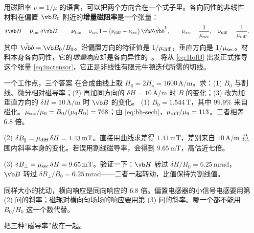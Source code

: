 用磁阻率 $\nu=1/\mu$ 的语言，可以把两个方向合在一个式子里。各向同性的非线性材料在偏置 $\vb B_0$ 附近的\textbf{增量磁阻率}是一个张量：
\begin{equation}
\delta\vb H=\boldsymbol\nu_{\rm inc}\,\delta\vb B,\qquad
\boldsymbol\nu_{\rm inc}=\nu_{\rm sec}\,\mathbf I+\bigl(\nu_{\rm diff}-\nu_{\rm sec}\bigr)\,\hat{\vb b}\hat{\vb b}^{\mathsf T},\qquad
\nu_{\rm sec}=\frac{1}{\mu_{\rm sec}},\quad \nu_{\rm diff}=\frac{1}{\mu_{\rm diff}},
\label{eq:bh-inc}
\end{equation}
其中 $\hat{\vb b}=\vb B_0/B_0$。沿偏置方向的特征值是 $1/\mu_{\rm diff}$，垂直方向是 $1/\mu_{\rm sec}$。材料本身各向同性，它的\emph{增量}响应却是各向异性的~\cite{comsolbh}。 将从 \eqref{eq:HofB} 出发正式推导这个张量 \eqref{eq:inctensor}，它正是非线性有限元牛顿迭代所需的切线。

\begin{example}[label=ex:bh-three]{一个工作点，三个答案}
在合成曲线上取 $H_0=2H_s=1600\,\mathrm{A/m}$。求：(1) $B_0$ 与割线、微分相对磁导率；(2) 再加同方向的 $\delta H=10\,\mathrm{A/m}$ 时 $B$ 的变化；(3) 改为加垂直方向的 $\delta H=10\,\mathrm{A/m}$ 时 $\vb B$ 的变化。
\solution
(1) $B_0=1.544\,\mathrm T$，其中 $99.9\%$ 来自磁化。$\mu_{\rm sec}/\mu_0=B_0/(\mu_0H_0)=768$；由 \eqref{eq:bh-sech}，$\mu_{\rm diff}/\mu_0=113$。二者相差 $6.8$ 倍。

(2) $\delta B_\parallel=\mu_{\rm diff}\,\delta H=1.43\,\mathrm{mT}$。直接用曲线求差得 $1.41\,\mathrm{mT}$，差别来自 $10\,\mathrm{A/m}$ 范围内斜率本身的变化。若误用割线磁导率，会得到 $9.65\,\mathrm{mT}$，高估近七倍。

(3) $\delta B_\perp=\mu_{\rm sec}\,\delta H=9.65\,\mathrm{mT}$。验证一下：$\vb H$ 转过 $\delta H/H_0=6.25\,\mathrm{mrad}$，$\vb B$ 转过 $\delta B_\perp/B_0=6.25\,\mathrm{mrad}$——二者一起转动，比值保持为割线值。

同样大小的扰动，横向响应是同向响应的 $6.8$ 倍。偏置电感器的小信号电感要用第 (2) 问的斜率；磁轭对横向匀场场的响应要用第 (3) 问的斜率。哪一个都不能用 $B_0/H_0$ 这一个数代替。
\end{example}

 把三种“磁导率”放在一起。


